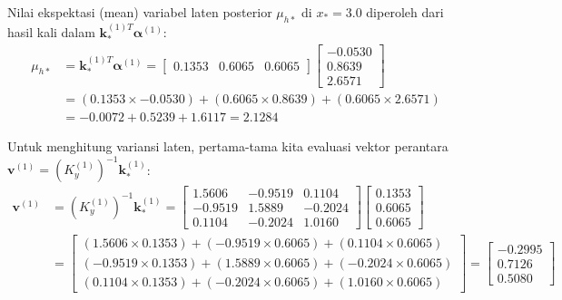 \documentclass[11pt,a4paper]{article}
\begin{document}
Nilai ekspektasi (mean) variabel laten posterior $\mu_{h*}$ di $x_* = 3.0$ diperoleh dari hasil kali dalam $\mathbf{k}_*^{(1)T} \boldsymbol{\alpha}^{(1)}$:
\begin{align}
\mu_{h*} &= \mathbf{k}_*^{(1)T} \boldsymbol{\alpha}^{(1)} = \begin{bmatrix} 0.1353 & 0.6065 & 0.6065 \end{bmatrix} \begin{bmatrix} -0.0530 \\ 0.8639 \\ 2.6571 \end{bmatrix} \nonumber \\
&= (0.1353 \times -0.0530) + (0.6065 \times 0.8639) + (0.6065 \times 2.6571) \nonumber \\
&= -0.0072 + 0.5239 + 1.6117 = \mathbf{2.1284}
\end{align}

Untuk menghitung variansi laten, pertama-tama kita evaluasi vektor perantara $\mathbf{v}^{(1)} = (K_y^{(1)})^{-1} \mathbf{k}_*^{(1)}$:
\begin{align}
\mathbf{v}^{(1)} &= (K_y^{(1)})^{-1} \mathbf{k}_*^{(1)} = \begin{bmatrix} 1.5606 & -0.9519 & 0.1104 \\ -0.9519 & 1.5889 & -0.2024 \\ 0.1104 & -0.2024 & 1.0160 \end{bmatrix} \begin{bmatrix} 0.1353 \\ 0.6065 \\ 0.6065 \end{bmatrix} \nonumber \\
&= \begin{bmatrix} (1.5606 \times 0.1353) + (-0.9519 \times 0.6065) + (0.1104 \times 0.6065) \\ (-0.9519 \times 0.1353) + (1.5889 \times 0.6065) + (-0.2024 \times 0.6065) \\ (0.1104 \times 0.1353) + (-0.2024 \times 0.6065) + (1.0160 \times 0.6065) \end{bmatrix} = \begin{bmatrix} -0.2995 \\ 0.7126 \\ 0.5080 \end{bmatrix}
\end{align}
\end{document}
